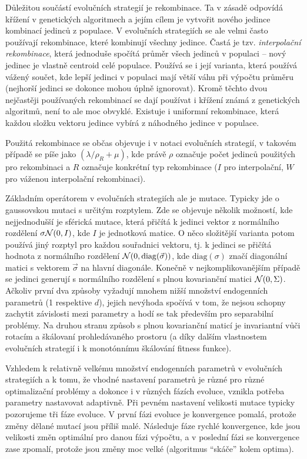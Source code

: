 Důležitou součástí evolučních strategií je rekombinace. Ta v zásadě odpovídá křížení v genetických algoritmech a jejím cílem je vytvořit nového jedince kombinací jedinců z populace. V evolučních strategiích se ale velmi často používají rekombinace, které kombinují všechny jedince. Častá je tzv. \emph{interpolační rekombinace}, která jednoduše spočítá průměr všech jedinců v populaci -- nový jedinec je vlastně centroid celé populace. Používá se i její varianta, která používá vážený součet, kde lepší jedinci v populaci mají větší váhu při výpočtu průměru (nejhorší jedinci se dokonce mohou úplně ignorovat). Kromě těchto dvou nejčastěji používaných rekombinací se dají používat i křížení známá z genetických algoritmů, není to ale moc obvyklé. Existuje i uniformní rekombinace, která každou složku vektoru jedince vybírá z náhodného jedince v populace. 

Použitá rekombinace se občas objevuje i v notaci evolučních strategií, v takovém případě se píše jako $(\lambda/\rho_R + \mu)$, kde právě $\rho$ označuje počet jedinců použitých pro rekombinaci a $R$ označuje konkrétní typ rekombinace ($I$ pro interpolační, $W$ pro váženou interpolační rekombinaci).

Základním operátorem v evolučních strategiích ale je mutace. Typicky jde o gaussovskou mutaci s určitým rozptylem. Zde se objevuje několik možností, kde nejjednodušší je sférická mutace, která přičítá k jedinci vektor z normálního rozdělení $\sigma\mathcal{N}(0, I)$, kde $I$ je jednotková matice. O něco složitější varianta potom používá jiný rozptyl pro každou souřadnici vektoru, tj. k jedinci se přičítá hodnota z normálního rozdělení $\mathcal{N}(0, \mathrm{diag}({\vec{\sigma}}))$, kde $\mathrm{diag}(\sigma)$ značí diagonální matici s vektorem $\vec{\sigma}$ na hlavní diagonále. Konečně v nejkomplikovanějším případě se jedinci generují s normálního rozdělení s plnou kovarianční matici $\mathcal{N}(0, \Sigma)$. Ačkoliv první dva způsoby vyžadují mnohem nižší množství endogenních parametrů (1 respektive $d$), jejich nevýhoda spočívá v tom, že nejsou schopny zachytit závislosti mezi parametry a hodí se tak především pro separabilní problémy. Na druhou stranu způsob s plnou kovarianční maticí je invariantní vůči rotacím a škálovaní prohledávaného prostoru (a díky dalším vlastnostem evolučních strategií i k monotónnímu škálování fitness funkce).

Vzhledem k relativně velkému množství endogenních parametrů v evolučních strategiích a k tomu, že vhodné nastavení parametrů je různé pro různé optimalizační problémy a dokonce i v různých fázích evoluce, vznikla potřeba parametry nastavovat adaptivně. Při pevném nastavení velikosti mutace typicky pozorujeme tři fáze evoluce. V první fázi evoluce je konvergence pomalá, protože změny dělané mutací jsou příliš malé. Následuje fáze rychlé konvergence, kde jsou velikosti změn optimální pro danou fázi výpočtu, a v poslední fázi se konvergence zase zpomalí, protože jsou změny moc velké (algoritmus ``skáče'' kolem optima).

